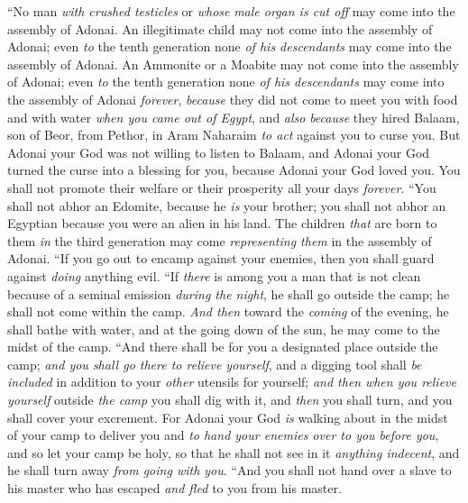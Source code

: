 \begin{biblechapter} %
\verse “No man \textit{with crushed testicles} or \textit{whose} \textit{male organ is cut off} may come into the assembly of Adonai.
\verse An illegitimate child may not come into the assembly of Adonai; even \textit{to} the tenth generation none \textit{of his descendants} may come into the assembly of Adonai.
\verse An Ammonite or a Moabite may not come into the assembly of Adonai; even \textit{to} the tenth generation none \textit{of his descendants} may come into the assembly of Adonai \textit{forever},
\verse \textit{because} they did not come to meet you with food and with water \textit{when you came out of Egypt}, and \textit{also} \textit{because} they hired Balaam, son of Beor, from Pethor, in Aram Naharaim \textit{to act} against you to curse you.
\verse But Adonai your God was not willing to listen to Balaam, and Adonai your God turned the curse into a blessing for you, because Adonai your God loved you.
\verse You shall not promote their welfare or their prosperity all your days \textit{forever}.
\verse “You shall not abhor an Edomite, because he \textit{is} your brother; you shall not abhor an Egyptian because you were an alien in his land.
\verse The children \textit{that} are born to them \textit{in} the third generation may come \textit{representing them} in the assembly of Adonai.
\verse “If you go out to encamp against your enemies, then you shall guard against \textit{doing} anything evil.
\verse “If \textit{there} is among you a man that is not clean because of a seminal emission \textit{during the night}, he shall go outside the camp; he shall not come within the camp.
\verse \textit{And then} toward the \textit{coming} of the evening, he shall bathe with water, and at the going down of the sun, he may come to the midst of the camp.
\verse “And there shall be for you a designated place outside the camp; \textit{and you shall go there to relieve yourself},
\verse and a digging tool shall \textit{be included} in addition to your \textit{other} utensils for yourself; \textit{and then} \textit{when you relieve yourself} outside \textit{the camp} you shall dig with it, and \textit{then} you shall turn, and you shall cover your excrement.
\verse For Adonai your God \textit{is} walking about in the midst of your camp to deliver you and \textit{to hand your enemies over to you before you}, and so let your camp be holy, so that he shall not see in it \textit{anything indecent}, and he shall turn away \textit{from going with you}.
\verse “And you shall not hand over a slave to his master who has escaped \textit{and fled} to you from his master.

\end{biblechapter}
